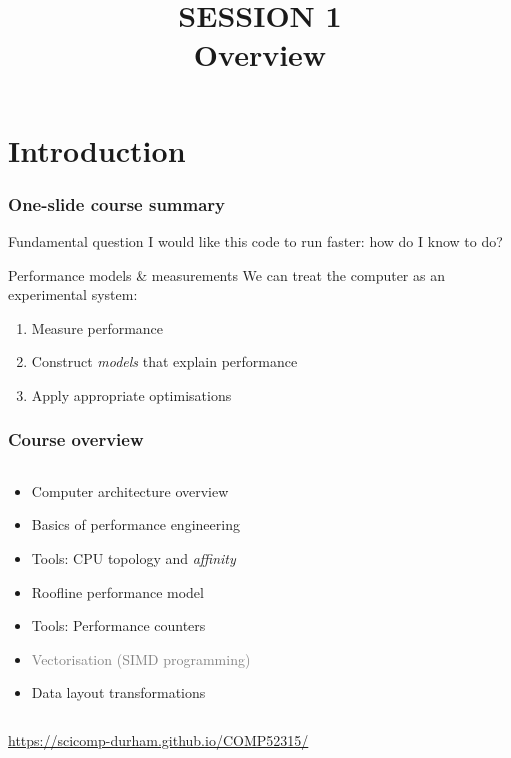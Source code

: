 \documentclass[dvipsnames,presentation,aspectratio=169,14pt]{beamer}
\begin{document}
\title{\firasemibold\color{White}%
  {\fontsize{20}{0}\selectfont SESSION 1\\
    \fontsize{40}{40}\selectfont Overview\par}}
\titleslide

\section{Introduction}

\begin{frame}
  \frametitle{One-slide course summary}

  \begin{challenge}{Fundamental question}
    I would like this code to run faster: how do I know  to do?
  \end{challenge}
  \pause
  \begin{answer}{Performance models \& measurements}
    We can treat the computer as an experimental system:
    \begin{enumerate}
    \item Measure performance

    \item Construct \emph{models} that explain performance

    \item Apply appropriate optimisations
    \end{enumerate}
  \end{answer}
\end{frame}

\begin{frame}
  \frametitle{Course overview}
  \begin{columns}
    \begin{column}{0.6\linewidth}
      \begin{itemize}[itemsep=5pt]
      \item Computer architecture overview
      \item Basics of performance engineering
      \item Tools: CPU topology and \emph{affinity}
      \item Roofline performance model
      \item Tools: Performance counters
      \item \textcolor{gray}{Vectorisation (SIMD programming)}
      \item Data layout transformations
      \end{itemize}
    \end{column}
    \hfill
    \begin{column}{0.3\linewidth}
      \centering
      {\color{palette2}%
      }
      \newline
    \end{column}
  \end{columns}
  \centering
  \vskip 20pt

  \url{https://scicomp-durham.github.io/COMP52315/}
\end{frame}
\end{document}

